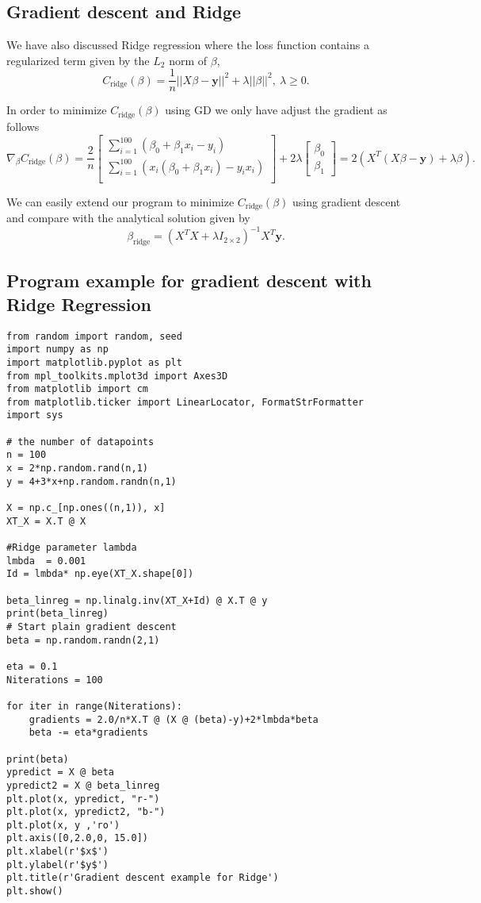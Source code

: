 \documentclass[%
oneside,                 %
final,                   %
10pt]{article}
\begin{document}
\subsection*{Gradient descent and Ridge}

We have also discussed Ridge regression where the loss function contains a regularized term given by the $L_2$ norm of $\beta$, 
\[
C_{\text{ridge}}(\beta) = \frac{1}{n}||X\beta -\mathbf{y}||^2 + \lambda ||\beta||^2, \ \lambda \geq 0.
\]

In order to minimize $C_{\text{ridge}}(\beta)$ using GD we only have adjust the gradient as follows 
\[
\nabla_\beta C_{\text{ridge}}(\beta)  = \frac{2}{n}\begin{bmatrix} \sum_{i=1}^{100} \left(\beta_0+\beta_1x_i-y_i\right) \\
\sum_{i=1}^{100}\left( x_i (\beta_0+\beta_1x_i)-y_ix_i\right) \\
\end{bmatrix} + 2\lambda\begin{bmatrix} \beta_0 \\ \beta_1\end{bmatrix} = 2 (X^T(X\beta - \mathbf{y})+\lambda \beta).
\]

We can easily extend our program to minimize $C_{\text{ridge}}(\beta)$ using gradient descent and compare with the analytical solution given by 
\[
\beta_{\text{ridge}} = \left(X^T X + \lambda I_{2 \times 2} \right)^{-1} X^T \mathbf{y}.
\]


\subsection*{Program example for gradient descent with Ridge Regression}
\begin{verbatim}
from random import random, seed
import numpy as np
import matplotlib.pyplot as plt
from mpl_toolkits.mplot3d import Axes3D
from matplotlib import cm
from matplotlib.ticker import LinearLocator, FormatStrFormatter
import sys

# the number of datapoints
n = 100
x = 2*np.random.rand(n,1)
y = 4+3*x+np.random.randn(n,1)

X = np.c_[np.ones((n,1)), x]
XT_X = X.T @ X

#Ridge parameter lambda
lmbda  = 0.001
Id = lmbda* np.eye(XT_X.shape[0])

beta_linreg = np.linalg.inv(XT_X+Id) @ X.T @ y
print(beta_linreg)
# Start plain gradient descent
beta = np.random.randn(2,1)

eta = 0.1
Niterations = 100

for iter in range(Niterations):
    gradients = 2.0/n*X.T @ (X @ (beta)-y)+2*lmbda*beta
    beta -= eta*gradients

print(beta)
ypredict = X @ beta
ypredict2 = X @ beta_linreg
plt.plot(x, ypredict, "r-")
plt.plot(x, ypredict2, "b-")
plt.plot(x, y ,'ro')
plt.axis([0,2.0,0, 15.0])
plt.xlabel(r'$x$')
plt.ylabel(r'$y$')
plt.title(r'Gradient descent example for Ridge')
plt.show()


\end{verbatim}
\end{document}
